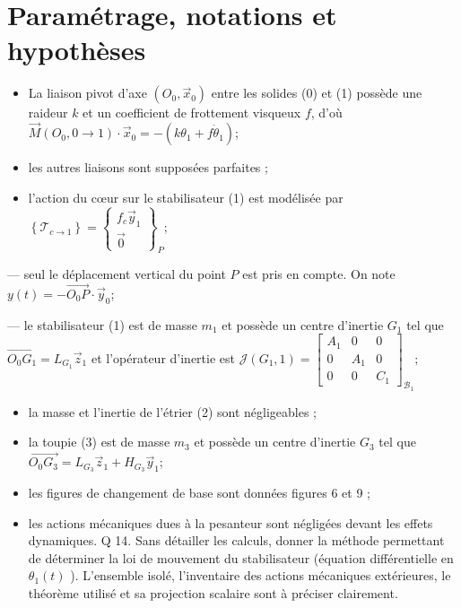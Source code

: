 \documentclass[10pt]{article}
\begin{document}
\section{Paramétrage, notations et hypothèses}
\begin{itemize}
  \item La liaison pivot d'axe $\left(O_{0}, \vec{x}_{0}\right)$ entre les solides (0) et (1) possède une raideur $k$ et un coefficient de frottement visqueux $f$, d'où $\vec{M}\left(O_{0}, 0 \rightarrow 1\right) \cdot \vec{x}_{0}=-\left(k \theta_{1}+f \dot{\theta}_{1}\right)$;

  \item les autres liaisons sont supposées parfaites ;

  \item l'action du cœur sur le stabilisateur (1) est modélisée par $\left\{\mathcal{T}_{c \rightarrow 1}\right\}=\left\{\begin{array}{c}f_{c} \vec{y}_{1} \\ \overrightarrow{0}\end{array}\right\}_{P}$;

\end{itemize}

— seul le déplacement vertical du point $P$ est pris en compte. On note $y(t)=-\overrightarrow{O_{0} P} \cdot \vec{y}_{0}$;

— le stabilisateur (1) est de masse $m_{1}$ et possède un centre d'inertie $G_{1}$ tel que $\overrightarrow{O_{0} G_{1}}=L_{G_{1}} \vec{z}_{1}$ et l'opérateur d'inertie est $\mathcal{J}\left(G_{1}, 1\right)=\left[\begin{array}{ccc}A_{1} & 0 & 0 \\ 0 & A_{1} & 0 \\ 0 & 0 & C_{1}\end{array}\right]_{\mathcal{B}_{1}} ;$

\begin{itemize}
  \item la masse et l'inertie de l'étrier (2) sont négligeables ;

  \item la toupie (3) est de masse $m_{3}$ et possède un centre d'inertie $G_{3}$ tel que $\overrightarrow{O_{0} G_{3}}=L_{G_{3}} \vec{z}_{1}+H_{G_{3}} \vec{y}_{1}$;

  \item les figures de changement de base sont données figures 6 et 9 ;

  \item les actions mécaniques dues à la pesanteur sont négligées devant les effets dynamiques. Q 14. Sans détailler les calculs, donner la méthode permettant de déterminer la loi de mouvement du stabilisateur (équation différentielle en $\theta_{1}(t)$ ). L'ensemble isolé, l'inventaire des actions mécaniques extérieures, le théorème utilisé et sa projection scalaire sont à préciser clairement.

\end{itemize}
\end{document}
